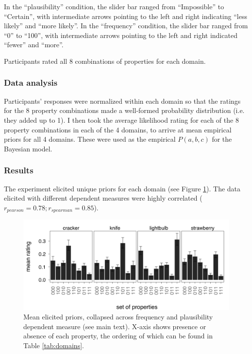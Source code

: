 \documentclass{llncs} %
\begin{document}
In the ``plausibility'' condition, the slider bar ranged from ``Impossible'' to ``Certain'', with intermediate arrows pointing to the left and right indicating ``less likely'' and ``more likely''. In the ``frequency'' condition, the slider bar ranged from ``0'' to ``100'', with intermediate arrows pointing to the left and right indicated ``fewer'' and ``more''. 

Participants rated all 8 combinations of properties for each domain.

\subsubsection{Data analysis}

Participants' responses were normalized within each domain so that the ratings for the 8 property combinations made a well-formed probability distribution (i.e. they added up to 1). I then took the average likelihood rating for each of the 8 property combinations in each of the 4 domains, to arrive at mean empirical priors for all 4 domains. These were used as the empirical $P(a,b,c)$ for the Bayesian model. 

\subsubsection{Results}

The experiment elicited unique priors for each domain (see Figure \ref{fig:priors}). The data elicited with different dependent measures were highly correlated ($r_{pearson} = 0.78; r_{spearman} = 0.85$). 

\begin{figure}
\centering
    \includegraphics[width=\columnwidth]{priors}
    \caption{Mean elicited priors, collapsed across frequency and plausibility dependent measure (see main text). X-axis shows presence or absence of each property, the ordering of which can be found in Table \ref{tab:domains}.}
  \label{fig:priors}
\end{figure}
\end{document}
